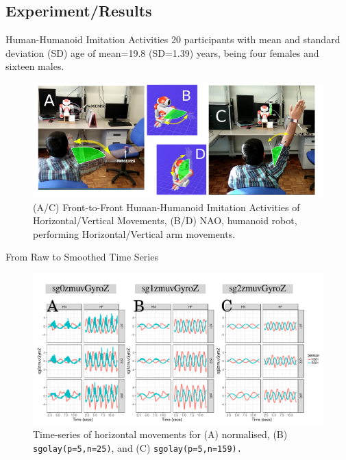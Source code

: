 \subsection{Experiment/Results}

{
\begin{frame}{Human-Humanoid Imitation Activities}
20 participants with mean and standard deviation (SD) age of 
mean=19.8 (SD=1.39) years, being four females and sixteen males.
    \begin{figure}
        \includegraphics[width=0.9\linewidth]{./figs/experiment/versions/drawing-v00}{}
	\caption[PA]{(A/C) Front-to-Front Human-Humanoid Imitation 
		Activities of Horizontal/Vertical Movements,
		(B/D) NAO, humanoid robot, performing 
		Horizontal/Vertical arm movements.
		}
   \end{figure}
\end{frame}
}




{
\begin{frame}{From Raw to Smoothed Time Series}
   \begin{figure}
        \includegraphics[width=0.9\linewidth]{./figs/results/ch6-ts-h/versions/drawing-v00}{}
	\caption{Time-series of horizontal movements for 
	(A) normalised, (B) \texttt{sgolay(p=5,n=25)}, and 
	(C) \texttt{sgolay(p=5,n=159).} } 
   \end{figure}
\end{frame}
}


